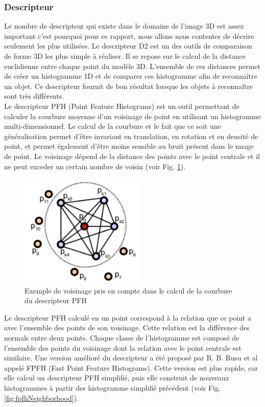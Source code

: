 \subsubsection{Descripteur}
\label{descriptor}
Le nombre de descripteur qui existe dans le domaine de l'image 3D est assez important c'est pourquoi pour ce rapport,
nous allons nous contenter de décrire seulement les plus utilisées. Le descripteur D2\cite{D2} est un des outils de 
comparaison de forme 3D les plus simple à réaliser. Il se repose sur le calcul de la distance euclidienne entre 
chaque point du modèle 3D. L'ensemble de ces distances permet de créer un histogramme 1D et de comparer ces histogramme
afin de reconnaître un objet. Ce descripteur fournit de bon résultat lorsque les objets à reconnaître sont très 
différents.\\

Le descripteur PFH\cite{PFH} (Point Feature Histograms) est un outil permettant de calculer la courbure moyenne d'un voisinage de point en utilisant un histogramme multi-dimensionnel. Le calcul de la courbure et le fait que ce soit une généralisation permet d'être invariant 
en translation, en rotation et en densité de point, et permet également d'être moins sensible au bruit présent dans le nuage de point. Le voisinage 
dépend de la distance des points avec le point centrale et il ne peut exceder un certain nombre de voisin 
(voir Fig. \ref{fig:pfhNeighborhood}).\\

\begin{figure}[!ht]
  \begin{center}
    \includegraphics[width=6cm]{image/PFH.png}
    \caption{Exemple de voisinage pris en compte dans le calcul de la courbure du descripteur PFH}
    \label{fig:pfhNeighborhood}
  \end{center}
\end{figure}

Le descripteur PFH calculé en un point correspond à la relation que ce point a avec l'ensemble des points de son voisinage. Cette relation
est la différence des normals entre deux points. Chaque classe de l'histogramme est composé de l'ensemble des points du voisinage dont 
la relation avec le point centrale est similaire. Une version amélioré du descripteur a été proposé par R. B. Rusu et al\cite{FPFH} appelé
FPFH (Fast Point Feature Histograms). Cette version est plus rapide, car elle calcul un descripteur PFH simplifié, puis elle construit
de nouveaux histogrammes à partir des histogramme simplifié précédent (voir Fig. \ref{fig:fpfhNeighborhood}).\\

